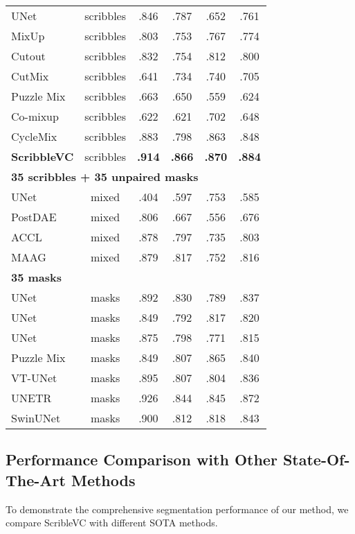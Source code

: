 \documentclass[sigconf,natbib=false]{acmart}
\begin{document}
\begin{table}[!ht]
{\begin{tabular}{l|c|ccc|c}
    UNet\cite{unet++} & scribbles & .846 & .787 & .652 & .761 \\
    MixUp\cite{mixup} & scribbles & .803 & .753 & .767 & .774 \\
    Cutout\cite{cutout} & scribbles & .832 & .754 & .812 & .800 \\
    CutMix\cite{cutmix} & scribbles & .641 & .734 & .740 & .705 \\
    Puzzle Mix\cite{puzzlemix} & scribbles & .663 & .650 & .559 & .624 \\
    Co-mixup\cite{comixup} & scribbles & .622 & .621 & .702 & .648 \\
    CycleMix\cite{Zhang_2022_CycleMix} & scribbles & .883 & .798 & .863 & .848 \\
    \rowcolor{mygray}
    \textbf{ScribbleVC} & scribbles & \textbf{.914} & \textbf{.866} & \textbf{.870} & \textbf{.884} \\ \hline
    \multicolumn{6}{l}{\textbf{35 scribbles + 35 unpaired masks}} \\ \hline
    UNet\cite{MAAG} & mixed & .404 & .597 & .753 & .585 \\
    PostDAE\cite{postdae} & mixed & .806 & .667 & .556 & .676 \\
    ACCL\cite{accl}  & mixed & .878 & .797 & .735 & .803 \\
    MAAG\cite{MAAG}  & mixed & .879 & .817 & .752 & .816 \\ \hline
    \multicolumn{6}{l}{\textbf{35 masks}} \\ \hline
    UNet\cite{unet} & masks & .892 & .830 & .789 & .837 \\
    UNet\cite{unet+} & masks & .849 & .792 & .817 & .820 \\
    UNet\cite{unet++} & masks & .875 & .798 & .771 & .815 \\
    Puzzle Mix\cite{puzzlemix} & masks &.849 & .807 & .865 & .840 \\
    VT-UNet & masks & .895 & .807 & .804 & .836 \\
    UNETR\cite{Hatamizadeh_2022_WACV} & masks & .926 & .844 & .845 & .872 \\
    SwinUNet\cite{swinunet} & masks & .900 & .812 & .818 & .843 \\
    \bottomrule[1pt]
    \end{tabular}}
  \label{ACDCresult}\vspace{-6mm}
\end{table}
\vspace{-4mm}
\subsection{Performance Comparison with Other State-Of-The-Art Methods}
To demonstrate the comprehensive segmentation performance of our method, we compare ScribleVC with different SOTA methods.
\end{document}
